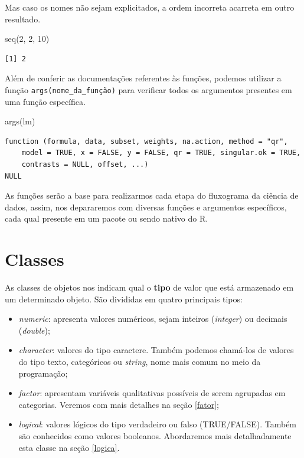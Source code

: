 \documentclass[
  brazilian,
]{book}
\newenvironment{Shaded}{\begin{snugshade}}{\end{snugshade}}
\newcommand{\DecValTok}[1]{\textcolor[rgb]{0.00,0.00,0.81}{#1}}
\newcommand{\FunctionTok}[1]{\textcolor[rgb]{0.00,0.00,0.00}{#1}}
\newcommand{\NormalTok}[1]{#1}
\begin{document}
Mas caso os nomes não sejam explicitados, a ordem incorreta acarreta em outro resultado.

\begin{Shaded}
\begin{Highlighting}[]
\FunctionTok{seq}\NormalTok{(}\DecValTok{2}\NormalTok{, }\DecValTok{2}\NormalTok{, }\DecValTok{10}\NormalTok{)}
\end{Highlighting}
\end{Shaded}

\begin{verbatim}
[1] 2
\end{verbatim}

Além de conferir as documentações referentes às funções, podemos utilizar a função \texttt{args(nome\_da\_função)} para verificar todos os argumentos presentes em uma função específica.

\begin{Shaded}
\begin{Highlighting}[]
\FunctionTok{args}\NormalTok{(lm)}
\end{Highlighting}
\end{Shaded}

\begin{verbatim}
function (formula, data, subset, weights, na.action, method = "qr", 
    model = TRUE, x = FALSE, y = FALSE, qr = TRUE, singular.ok = TRUE, 
    contrasts = NULL, offset, ...) 
NULL
\end{verbatim}

As funções serão a base para realizarmos cada etapa do fluxograma da ciência de dados, assim, nos depararemos com diversas funções e argumentos específicos, cada qual presente em um pacote ou sendo nativo do R.

\hypertarget{classes}{%
\section{Classes}\label{classes}}

As classes de objetos nos indicam qual o \textbf{tipo} de valor que está armazenado em um determinado objeto. São divididas em quatro principais tipos:

\begin{itemize}
\item
  \emph{numeric}: apresenta valores numéricos, sejam inteiros (\emph{integer}) ou decimais (\emph{double});
\item
  \emph{character}: valores do tipo caractere. Também podemos chamá-los de valores do tipo texto, categóricos ou \emph{string}, nome mais comum no meio da programação;
\item
  \emph{factor}: apresentam variáveis qualitativas possíveis de serem agrupadas em categorias. Veremos com mais detalhes na seção \ref{fator};
\item
  \emph{logical}: valores lógicos do tipo verdadeiro ou falso (TRUE/FALSE). Também são conhecidos como valores booleanos. Abordaremos mais detalhadamente esta classe na seção \ref{logica}.
\end{itemize}
\end{document}
